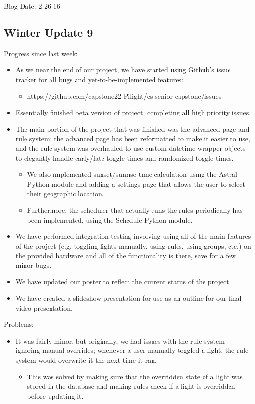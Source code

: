 Blog Date: 2-26-16

\subsection{Winter Update 9}
Progress since last week:
\begin{itemize}
   \item As we near the end of our project, we have started using Github's issue tracker for all bugs and yet-to-be-implemented features:
      \begin{itemize}
         \item https://github.com/capstone22-Pilight/cs-senior-capstone/issues
      \end{itemize}
   \item Essentially finished beta version of project, completing all high priority issues.
   \item The main portion of the project that was finished was the advanced page and rule system; the advanced page has been reformatted to make it easier to use, and the rule system was overhauled to use custom datetime wrapper objects to elegantly handle early/late toggle times and randomized toggle times.
      \begin{itemize}
         \item We also implemented sunset/sunrise time calculation using the Astral Python module and adding a settings page that allows the user to select their geographic location.
         \item Furthermore, the scheduler that actually runs the rules periodically has been implemented, using the Schedule Python module.
      \end{itemize}
   \item We have performed integration testing involving using all of the main features of the project (e.g. toggling lights manually, using rules, using groups, etc.) on the provided hardware and all of the functionality is there, save for a few minor bugs.
   \item We have updated our poster to reflect the current status of the project.
   \item We have created a slideshow presentation for use as an outline for our final video presentation.
\end{itemize}
Problems:
\begin{itemize}
   \item It was fairly minor, but originally, we had issues with the rule system ignoring manual overrides; whenever a user manually toggled a light, the rule system would overwrite it the next time it ran.
      \begin{itemize}
         \item This was solved by making sure that the overridden state of a light was stored in the database and making rules check if a light is overridden before updating it.
      \end{itemize}
\end{itemize}
